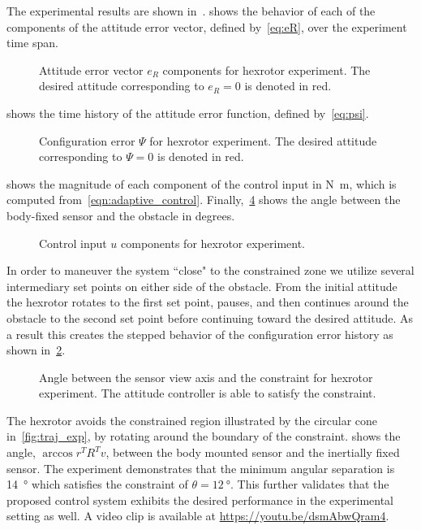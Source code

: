 The experimental results are shown in~.
 shows the behavior of each of the components of the attitude error vector, defined by~\cref{eq:eR}, over the experiment time span.
\begin{figure}[htbp]
    \centering
    
    \caption{Attitude error vector \( e_R \) components for hexrotor experiment.
    The desired attitude corresponding to \( e_R = 0 \) is denoted in red.\label{fig:eR_exp}}
\end{figure}
 shows the time history of the attitude error function, defined by~\cref{eq:psi}.
\begin{figure}[htbp]
    \centering
    
    \caption{Configuration error \( \Psi \) for hexrotor experiment.
    The desired attitude corresponding to \( \Psi = 0 \) is denoted in red.\label{fig:Psi_exp}}
\end{figure}
 shows the magnitude of each component of the control input in \si{\newton\meter}, which is computed from~\cref{eqn:adaptive_control}.
Finally,~\cref{fig:con_angle_exp} shows the angle between the body-fixed sensor and the obstacle in degrees.
\begin{figure}[htbp]
    \centering
    
    \caption{Control input \( u \) components for hexrotor experiment.\label{fig:u_exp}}
\end{figure}
In order to maneuver the system ``close" to the constrained zone we utilize several intermediary set points on either side of the obstacle.
From the initial attitude the hexrotor rotates to the first set point, pauses, and then continues around the obstacle to the second set point before continuing toward the desired attitude.
As a result this creates the stepped behavior of the configuration error history as shown in~\cref{fig:Psi_exp}.
\begin{figure}[htbp]
    \centering
    
    \caption{Angle between the sensor view axis and the constraint for hexrotor experiment.
    The attitude controller is able to satisfy the constraint. \label{fig:con_angle_exp}}
\end{figure}

The hexrotor avoids the constrained region illustrated by the circular cone in~\cref{fig:traj_exp}, by rotating around the boundary of the constraint. 
 shows the angle, \( \arccos r^T R^T v \), between the body mounted sensor and the inertially fixed sensor.
The experiment demonstrates that the minimum angular separation is \SI{14}{\degree} which satisfies the constraint of \( \theta = \SI{12}{\degree} \).
This further validates that the proposed control system exhibits the desired performance in the experimental setting as well. 
A video clip is available at \url{https://youtu.be/dsmAbwQram4}.

